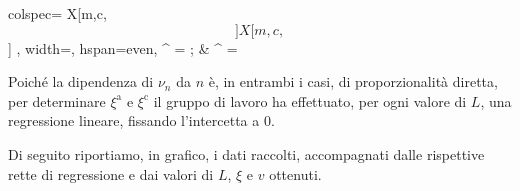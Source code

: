 \documentclass{article}
\newcommand*{\diam}{\varnothing}
\begin{document}
\begin{center}\begin{tblr}{
  colspec={ X[m,c,$$]X[m,c,$$] },
  width=\textwidth,
  hspan=even,
}
  \xi^ = \frac{v}{2L + 1.6 \diam};
  &
  \xi^ = \frac{v}{4L + 1.6 \diam}
\end{tblr}\end{center}

Poiché la dipendenza di $\nu_n$ da $n$ è, in entrambi i casi,
di proporzionalità diretta, per determinare $\xi^\text{a}$
e $\xi^\text{c}$ il gruppo di lavoro ha effettuato, per ogni
valore di $L$, una regressione lineare, fissando l'intercetta a 0.

Di seguito riportiamo, in grafico, i dati raccolti, accompagnati
dalle rispettive rette di regressione e dai valori di $L$,
$\xi$ e $v$ ottenuti.
\end{document}
